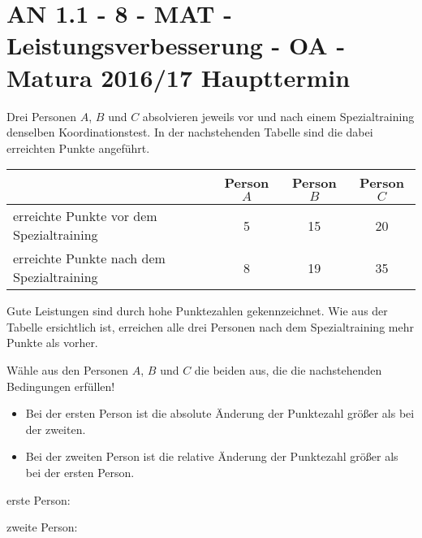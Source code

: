 \section{AN 1.1 - 8 - MAT - Leistungsverbesserung - OA - Matura 2016/17 Haupttermin}

\begin{beispiel}[AN 1.1]{1} %
Drei Personen $A$, $B$ und $C$ absolvieren jeweils vor und nach einem Spezialtraining denselben
Koordinationstest. In der nachstehenden Tabelle sind die dabei erreichten Punkte angeführt.

\begin{tabular}{|l|c|c|c|}\hhline{~|---}
\multicolumn{1}{c|}{}& \cellcolor{black!20} Person $A$ & \cellcolor{black!20}Person $B$ & \cellcolor{black!20}Person $C$ \\ \hline
\cellcolor{black!20}erreichte Punkte vor dem Spezialtraining & 5 & 15 & 20 \\ \hline
\cellcolor{black!20}erreichte Punkte nach dem Spezialtraining & 8 & 19 & 35 \\ \hline
\end{tabular}\leer

Gute Leistungen sind durch hohe Punktezahlen gekennzeichnet. Wie aus der Tabelle ersichtlich
ist, erreichen alle drei Personen nach dem Spezialtraining mehr Punkte als vorher. \leer

Wähle aus den Personen $A$, $B$ und $C$ die beiden aus, die die nachstehenden Bedingungen
erfüllen! 

\begin{itemize}
	\item Bei der ersten Person ist die absolute Änderung der Punktezahl größer als bei der zweiten.
	\item Bei der zweiten Person ist die relative Änderung der Punktezahl größer als bei der ersten Person.
\end{itemize}

erste Person: 

zweite Person: 
\end{beispiel}